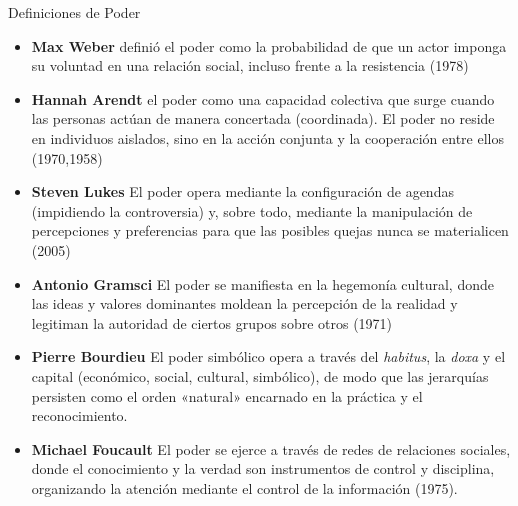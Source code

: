 \documentclass[aspectratio=169,xcolor=dvipsnames]{beamer}
\begin{document}
\begin{frame}{Definiciones de Poder}
    \begin{itemize}
    \item \textbf{Max Weber} definió el poder como la probabilidad de que un actor imponga su voluntad en una relación social, incluso frente a la resistencia (1978)
    \item \textbf{Hannah Arendt} el poder como una capacidad colectiva que surge cuando las personas actúan de manera concertada (coordinada). El poder no reside en individuos aislados, sino en la acción conjunta y la cooperación entre ellos (1970,1958)
    \item \textbf{Steven Lukes} El poder opera mediante la configuración de agendas (impidiendo la controversia) y, sobre todo, mediante la manipulación de percepciones y preferencias para que las posibles quejas nunca se materialicen (2005)
    \end{itemize}
\end{frame}
\begin{frame}
    \begin{itemize}
    \item \textbf{Antonio Gramsci} El poder se manifiesta en la hegemonía cultural, donde las ideas y valores dominantes moldean la percepción de la realidad y legitiman la autoridad de ciertos grupos sobre otros (1971)
    \item \textbf{Pierre Bourdieu} El poder simbólico opera a través del \textit{habitus}, la \textit{doxa} y el capital (económico, social, cultural, simbólico), de modo que las jerarquías persisten como el orden «natural» encarnado en la práctica y el reconocimiento.

    \item  \textbf{Michael Foucault} El poder se ejerce a través de redes de relaciones sociales, donde el conocimiento y la verdad son instrumentos de control y disciplina, organizando la atención mediante el control de la información (1975). 
    \end{itemize}
\end{frame}
\end{document}
